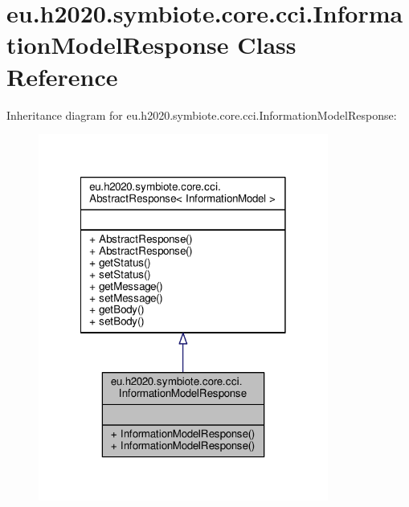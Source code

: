 \hypertarget{classeu_1_1h2020_1_1symbiote_1_1core_1_1cci_1_1InformationModelResponse}{}\section{eu.\+h2020.\+symbiote.\+core.\+cci.\+Information\+Model\+Response Class Reference}
\label{classeu_1_1h2020_1_1symbiote_1_1core_1_1cci_1_1InformationModelResponse}


Inheritance diagram for eu.\+h2020.\+symbiote.\+core.\+cci.\+Information\+Model\+Response\+:
\nopagebreak
\begin{figure}[H]
\begin{center}
\leavevmode
\includegraphics[width=270pt]{classeu_1_1h2020_1_1symbiote_1_1core_1_1cci_1_1InformationModelResponse__inherit__graph}
\end{center}
\end{figure}


